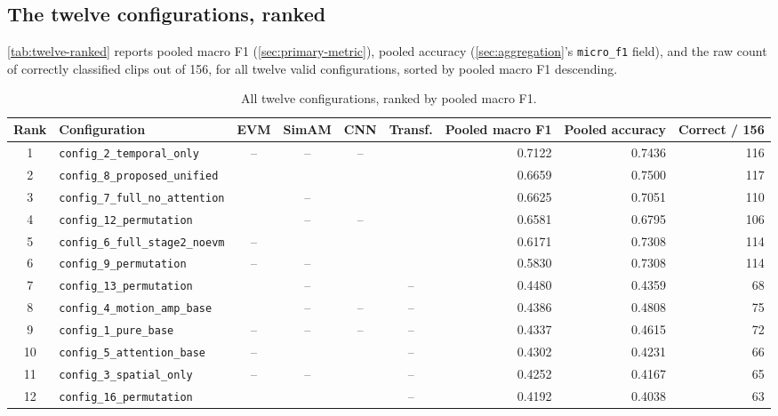 \subsection{The twelve configurations, ranked}
\label{sec:twelve-ranked}

\autoref{tab:twelve-ranked} reports pooled macro F1 (\autoref{sec:primary-metric}), pooled accuracy (\autoref{sec:aggregation}'s \texttt{micro\_f1} field), and the raw count of correctly classified clips out of 156, for all twelve valid configurations, sorted by pooled macro F1 descending.

\begin{table}[htbp]
	\centering
	\footnotesize
	\begin{tabular}{c l c c c c r r r}
		\hline
		\textbf{Rank} & \textbf{Configuration} & \textbf{EVM} & \textbf{SimAM} & \textbf{CNN} & \textbf{Transf.} & \textbf{Pooled macro F1} & \textbf{Pooled accuracy} & \textbf{Correct / 156} \\
		\hline
		1  & \texttt{config\_2\_temporal\_only}      & --  & --  & --  & \checkmark & 0.7122 & 0.7436 & 116 \\
		2  & \texttt{config\_8\_proposed\_unified}   & \checkmark & \checkmark & \checkmark & \checkmark & 0.6659 & 0.7500 & 117 \\
		3  & \texttt{config\_7\_full\_no\_attention} & \checkmark & --  & \checkmark & \checkmark & 0.6625 & 0.7051 & 110 \\
		4  & \texttt{config\_12\_permutation}        & \checkmark & --  & --  & \checkmark & 0.6581 & 0.6795 & 106 \\
		5  & \texttt{config\_6\_full\_stage2\_noevm} & --  & \checkmark & \checkmark & \checkmark & 0.6171 & 0.7308 & 114 \\
		6  & \texttt{config\_9\_permutation}         & --  & --  & \checkmark & \checkmark & 0.5830 & 0.7308 & 114 \\
		7  & \texttt{config\_13\_permutation}        & \checkmark & --  & \checkmark & --  & 0.4480 & 0.4359 & 68 \\
		8  & \texttt{config\_4\_motion\_amp\_base}   & \checkmark & --  & --  & --  & 0.4386 & 0.4808 & 75 \\
		9  & \texttt{config\_1\_pure\_base}          & --  & --  & --  & --  & 0.4337 & 0.4615 & 72 \\
		10 & \texttt{config\_5\_attention\_base}     & --  & \checkmark & \checkmark & --  & 0.4302 & 0.4231 & 66 \\
		11 & \texttt{config\_3\_spatial\_only}       & --  & --  & \checkmark & --  & 0.4252 & 0.4167 & 65 \\
		12 & \texttt{config\_16\_permutation}        & \checkmark & \checkmark & \checkmark & --  & 0.4192 & 0.4038 & 63 \\
		\hline
	\end{tabular}
	\caption[All twelve configurations, ranked by pooled macro F1]{All twelve configurations, ranked by pooled macro F1.}
	\label{tab:twelve-ranked}
\end{table}

